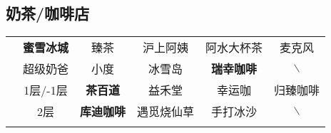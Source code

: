 \subsection[奶茶/咖啡店]{奶茶/咖啡店}
\begin{table}[H]
    \centering
    \begin{tabular}{|c|c|c|c|c|c|}
        \Xhline{1.2pt}
        \multirow{2}{*}{食堂} & \textbf{蜜雪冰城} & 臻茶            & 沪上阿姨  %
                            & 阿水大杯茶         & 麦克风                   \\
        \cline{2-6}
                            & 超级奶爸          & 小度            & 冰雪岛   %
                            & \textbf{瑞幸咖啡} & $\backslash$          \\
        \Xhline{1.2pt}
        \multirow{2}{*}{大服} & 1层/-1层        & \textbf{茶百道}  & 益禾堂   %
                            & 幸运咖           & 归臻咖啡                  \\
        \cline{2-6}
                            & 2层            & \textbf{库迪咖啡} & 遇觅烧仙草 %
                            & 手打冰沙          & $\backslash$          \\
        \Xhline{1.2pt}
    \end{tabular}
\end{table}

